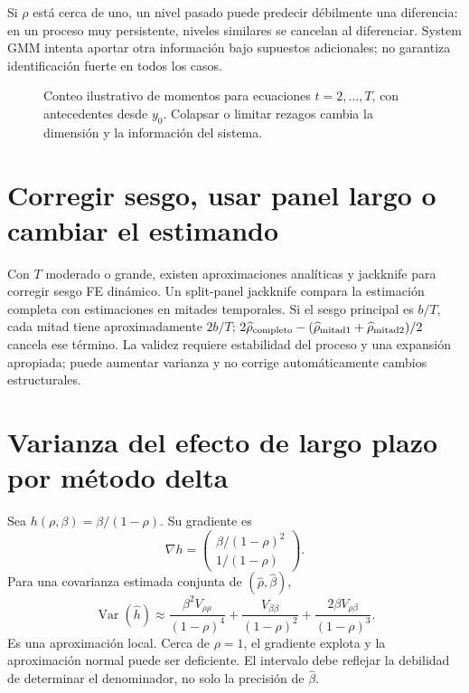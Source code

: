 \documentclass[11pt,a4paper]{article}
\DeclareMathOperator{\Var}{Var}
\theoremstyle{definition}
\begin{document}
Si $\rho$ está cerca de uno, un nivel pasado puede predecir débilmente una diferencia:
en un proceso muy persistente, niveles similares se cancelan al diferenciar.
System GMM intenta aportar otra información bajo supuestos adicionales; no garantiza identificación fuerte en todos los casos.



\begin{figure}[htbp]\centering
{}
\caption{Conteo ilustrativo de momentos para ecuaciones $t=2,\ldots,T$, con antecedentes desde $y_0$. Colapsar o limitar rezagos cambia la dimensión y la información del sistema.}\label{fig:panel-14}
\end{figure}
\section{Corregir sesgo, usar panel largo o cambiar el estimando}
Con $T$ moderado o grande, existen aproximaciones analíticas y jackknife para corregir sesgo FE dinámico.
Un split-panel jackknife compara la estimación completa con estimaciones en mitades temporales.
Si el sesgo principal es $b/T$, cada mitad tiene aproximadamente $2b/T$;
$2\widehat\rho_{\rm completo}-(\widehat\rho_{\rm mitad1}+\widehat\rho_{\rm mitad2})/2$ cancela ese término.
La validez requiere estabilidad del proceso y una expansión apropiada; puede aumentar varianza y no corrige automáticamente cambios estructurales.

\section{Varianza del efecto de largo plazo por método delta}
Sea $h(\rho,\beta)=\beta/(1-\rho)$.
Su gradiente es
\[
\nabla h=\begin{pmatrix}\beta/(1-\rho)^2\\1/(1-\rho)\end{pmatrix}.
\]
Para una covarianza estimada conjunta de $(\widehat\rho,\widehat\beta)$,
\[
\Var(\widehat h)\approx
\frac{\beta^2V_{\rho\rho}}{(1-\rho)^4}
+\frac{V_{\beta\beta}}{(1-\rho)^2}
+\frac{2\beta V_{\rho\beta}}{(1-\rho)^3}.
\]
Es una aproximación local. Cerca de $\rho=1$, el gradiente explota y la aproximación normal puede ser deficiente. El intervalo debe reflejar la debilidad de determinar el denominador, no solo la precisión de $\widehat\beta$.
\end{document}
